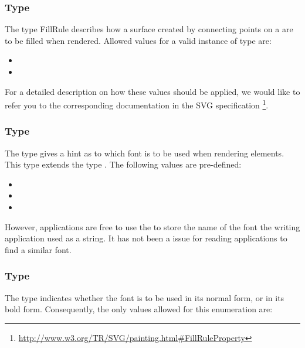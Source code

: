 \subsubsection{Type \fixttspace{}}

The type FillRule describes how a surface created by connecting 
points on a \Polygon are to be filled when rendered. Allowed values for a valid instance of type  are:

\begin{itemize}
 \item {} 
 \item {}
\end{itemize}

For a detailed description on how these values should be applied, we would like to refer you to the corresponding documentation in the SVG specification  \footnote{ \url{http://www.w3.org/TR/SVG/painting.html\#FillRuleProperty} }. 

\subsubsection{Type \fixttspace{}}

The \FontFamily type gives a hint as to which font is to be used when
rendering \Text elements. This type extends the type . The following values are pre-defined: 

\begin{itemize}
 \item {}
 \item {}
 \item {}
\end{itemize}

However, applications are free to use the \FontFamily to store the name of the font the writing application used as a string. It has not been a issue for reading applications to find a similar font. 

\subsubsection{Type \fixttspace{}}
The type \FontWeight indicates whether the font is to be used in its normal form, or in its bold form. Consequently, the only values allowed for this enumeration are: 


